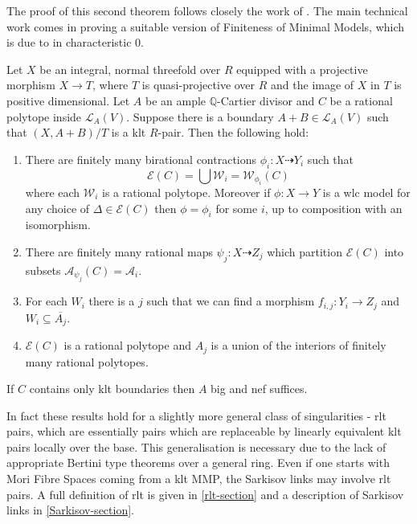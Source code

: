 \documentclass[a4paper,12pt]{amsart}
\begin{document}
	The proof of this second theorem follows closely the work of \cite{hacon2009sarkisov}. The main technical work comes in proving a suitable version of Finiteness of Minimal Models, which is due to \cite{birkar2010existence} in characteristic $0$. 
	
		\begin{theorem}\label{Main_Finite1}
		Let $X$ be an integral, normal threefold over $R$ equipped with a projective morphism $X \to T$, where $T$ is quasi-projective over $R$ and the image of $X$ in $T$ is positive dimensional. Let $A$ be an ample $\mathbb{Q}$-Cartier divisor and $C$ be a rational polytope inside $\mathcal{L}_{A}(V)$. Suppose there is a boundary $A+B \in \mathcal{L}_{A}(V)$ such that $(X,A+B)/T$ is a klt $R$-pair. Then the following hold:
		\begin{enumerate}
			\item There are finitely many birational contractions $\phi_{i}:X \dashrightarrow Y_{i}$ such that 
			\[\mathcal{E}(C) = \bigcup \mathcal{W}_{i}=\mathcal{W}_{\phi_{i}}(C)\]
			where each $\mathcal{W}_{i}$ is a rational polytope. Moreover if $\phi:X \to Y$ is a wlc model for any choice of $\Delta \in \mathcal{E}(C)$ then $\phi=\phi_{i}$ for some $i$, up to composition with an isomorphism.
			
			\item There are finitely many rational maps $\psi_{j}:X \dashrightarrow Z_{j}$ which partition $\mathcal{E}(C)$ into subsets $\mathcal{A}_{\psi_{j}}(C)=\mathcal{A}_{i}$.
			\item  For each $W_{i}$ there is a $j$ such that we can find a morphism $f_{i,j}: Y_{i} \to Z_{j}$ and $W_{i} \subseteq \overline{A_{j}}$.
			\item  $\mathcal{E}(C)$ is a rational polytope and $A_{j}$ is a union of the interiors of finitely many rational polytopes.
		\end{enumerate}
	
	If $C$ contains only klt boundaries then $A$ big and nef suffices.
	\end{theorem}

	In fact these results hold for a slightly more general class of singularities - rlt pairs, which are essentially pairs which are replaceable by linearly equivalent klt pairs locally over the base. This generalisation is necessary due to the lack of appropriate Bertini type theorems over a general ring. Even if one starts with Mori Fibre Spaces coming from a klt MMP, the Sarkisov links may involve rlt pairs. A full definition of rlt is given in \autoref{rlt-section} and a description of Sarkisov links in \autoref{Sarkisov-section}.
	
\end{document}
